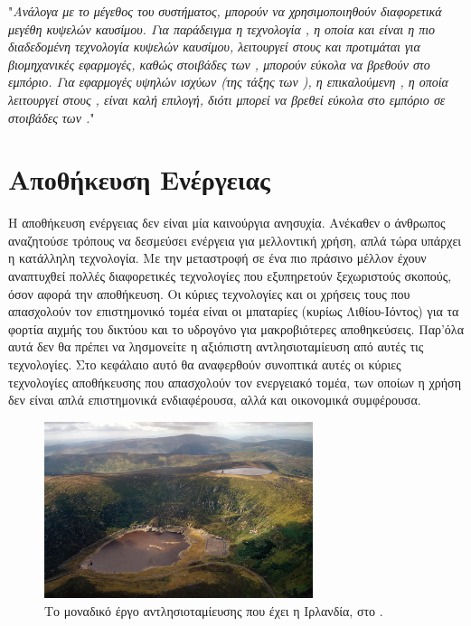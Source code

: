 \documentclass[12pt]{report}
\begin{document}
"{\textit{Ανάλογα με το μέγεθος του συστήματος, μπορούν να χρησιμοποιηθούν διαφορετικά μεγέθη κυψελών καυσίμου. Για παράδειγμα η τεχνολογία {}, η οποία και είναι η πιο διαδεδομένη τεχνολογία κυψελών καυσίμου,
λειτουργεί στους {} και προτιμάται για βιομηχανικές εφαρμογές, καθώς στοιβάδες των {}, μπορούν εύκολα να βρεθούν στο εμπόριο. Για εφαρμογές υψηλών ισχύων (της τάξης των {}),
η επικαλούμενη {}, η οποία λειτουργεί στους {}, είναι καλή επιλογή, διότι μπορεί να βρεθεί εύκολα στο εμπόριο σε στοιβάδες των {}.}}"

\chapter{Αποθήκευση Ενέργειας}
\label{chap:storage}
Η αποθήκευση ενέργειας δεν είναι μία καινούργια ανησυχία. Ανέκαθεν ο άνθρωπος αναζητούσε τρόπους να δεσμεύσει ενέργεια για μελλοντική χρήση, απλά τώρα υπάρχει η κατάλληλη τεχνολογία. 
Με την μεταστροφή σε ένα πιο πράσινο μέλλον έχουν αναπτυχθεί πολλές διαφορετικές τεχνολογίες που εξυπηρετούν ξεχωριστούς σκοπούς, όσον αφορά την αποθήκευση. Οι κύριες τεχνολογίες και οι χρήσεις τους που απασχολούν
τον επιστημονικό τομέα
είναι οι μπαταρίες (κυρίως Λιθίου-Ιόντος) για τα φορτία αιχμής του δικτύου και το υδρογόνο για μακροβιότερες αποθηκεύσεις. Παρ'όλα αυτά δεν θα πρέπει να λησμονείτε η αξιόπιστη αντλησιοταμίευση από αυτές τις τεχνολογίες. 
Στο κεφάλαιο αυτό θα αναφερθούν συνοπτικά αυτές οι κύριες τεχνολογίες αποθήκευσης που απασχολούν τον ενεργειακό τομέα, των οποίων η χρήση δεν είναι απλά επιστημονικά ενδιαφέρουσα, αλλά και οικονομικά συμφέρουσα.

\begin{figure}[h]
				\center
				\includegraphics[width=0.7\textwidth]{turlough-hill}
				\captionsetup{name=Εικόνα, width=0.8\textwidth}
				\caption{Το μοναδικό έργο αντλησιοταμίευσης που έχει η Ιρλανδία, στο {}.}
				\label{fig:turlough-hill}
\end{figure}
\end{document}
